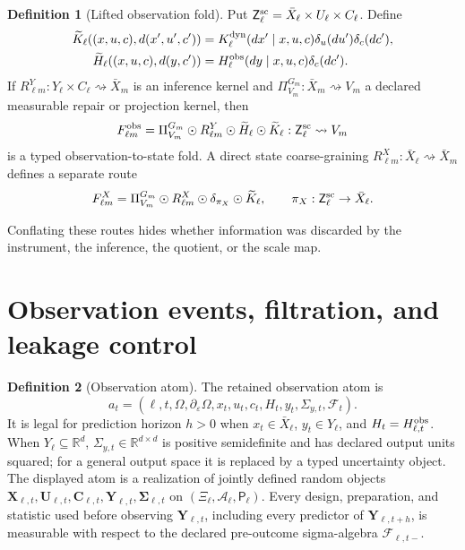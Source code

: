 \documentclass[11pt,a4paper]{article}
\theoremstyle{definition}
\newtheorem{definition}{Definition}[section]
\theoremstyle{plain}
\theoremstyle{remark}
\newcommand{\Prob}{\mathsf P}
\begin{document}
\begin{definition}[Lifted observation fold]\label{def:obsfold}
Put
\(\mathsf Z_\ell^{\rm sc}
=\bar X_\ell\times U_\ell\times C_\ell\).  Define
\begin{align*}
\widetilde K_\ell((x,u,c),d(x',u',c'))
 &=K_\ell^{\rm dyn}(dx'\mid x,u,c)\delta_u(du')\delta_c(dc'),\\
\widetilde H_\ell((x,u,c),d(y,c'))
 &=H_\ell^{\rm obs}(dy\mid x,u,c)\delta_c(dc').
\end{align*}
If \(R_{\ell m}^{Y}:Y_\ell\times C_\ell\rightsquigarrow\bar X_m\) is an
inference kernel and \(\Pi_{V_m}^{G_m}:\bar X_m\rightsquigarrow V_m\) a
declared measurable repair or projection kernel, then
\[
F_{\ell m}^{\rm obs}
=\Pi_{V_m}^{G_m}\odot R_{\ell m}^{Y}
\odot\widetilde H_\ell\odot\widetilde K_\ell
:\mathsf Z_\ell^{\rm sc}\rightsquigarrow V_m
\]
is a typed observation-to-state fold.  A direct state coarse-graining
\(R_{\ell m}^{X}:\bar X_\ell\rightsquigarrow\bar X_m\) defines a separate
route
\[
F_{\ell m}^{X}
=\Pi_{V_m}^{G_m}\odot R_{\ell m}^{X}\odot
\delta_{\pi_X}\odot\widetilde K_\ell,
\qquad
\pi_X:\mathsf Z_\ell^{\rm sc}\to\bar X_\ell .
\]
\end{definition}

Conflating these routes hides whether information was discarded by the
instrument, the inference, the quotient, or the scale map.

\section{Observation events, filtration, and leakage control}\label{sec:observation}

\begin{definition}[Observation atom]\label{def:atom}
The retained observation atom is
\[
a_t=(\ell,t,\Omega,\partial_\varepsilon\Omega,x_t,u_t,c_t,
H_t,y_t,\Sigma_{y,t},\mathcal F_t).
\]
It is legal for prediction horizon \(h>0\) when \(x_t\in\bar X_\ell\),
\(y_t\in Y_\ell\), and \(H_t=H_{\ell,t}^{\rm obs}\).  When
\(Y_\ell\subseteq\mathbb R^d\), \(\Sigma_{y,t}\in\mathbb R^{d\times d}\) is
positive semidefinite and has declared output units squared; for a general
output space it is replaced by a typed uncertainty object.
The displayed atom is a realization of jointly defined random objects
\(\mathbf X_{\ell,t},\mathbf U_{\ell,t},\mathbf C_{\ell,t},
\mathbf Y_{\ell,t},\boldsymbol\Sigma_{\ell,t}\) on
\((\Xi_\ell,\mathcal A_\ell,\Prob_\ell)\).  Every design, preparation, and
statistic used before observing \(\mathbf Y_{\ell,t}\), including every
predictor of \(\mathbf Y_{\ell,t+h}\), is measurable with respect to the
declared pre-outcome sigma-algebra \(\mathcal F_{\ell,t-}\).
\end{definition}
\end{document}
